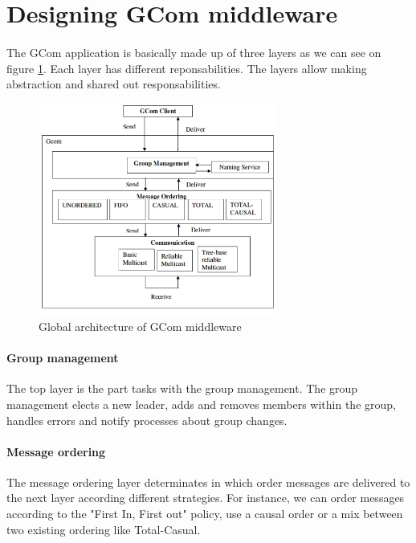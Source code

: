 \section{Designing GCom middleware}

\paragraph{}{
	The GCom application is basically made up of three layers as
 we can see on figure \ref{fig:architecture}.
 Each layer has different reponsabilities. The layers allow 
 making abstraction and shared out responsabilities.
}

\begin{figure}[!ht]
	\begin{center}
	\includegraphics[width=0.7\textwidth]{figures/gcom_architecture.png}
	\end{center}
	\caption{Global architecture of GCom middleware}
	\label{fig:architecture}
\end{figure}

\paragraph{Group management}{
	The top layer is the part tasks with the group management.
 The group management elects a new leader, adds and removes
 members within the group, handles errors and notify processes
 about group changes.
}

\paragraph{Message ordering}{
	The message ordering layer determinates in which order
 messages are delivered to the next layer according different
 strategies. For instance, we can order messages according to the
 "First In, First out" policy, use a causal order or a mix
 between two existing ordering like Total-Casual.
}

